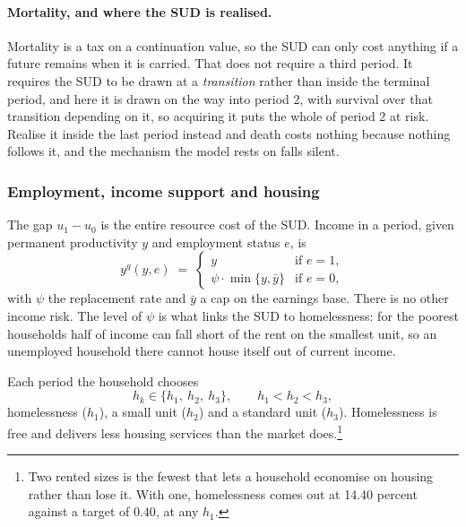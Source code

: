 \documentclass[10pt]{article}
\begin{document}
\paragraph{Mortality, and where the SUD is realised.} Mortality is a tax on
a continuation value, so the SUD can only cost anything if a future remains
when it is carried. That does not require a third period. It requires the
SUD to be drawn at a \emph{transition} rather than inside the terminal
period, and here it is drawn on the way into period 2, with survival over that
transition depending on it, so acquiring it puts the whole of period 2 at risk.
Realise it inside the last period instead and death costs nothing because
nothing follows it, and the mechanism the model rests on falls silent.


\subsubsection{Employment, income support and housing}\label{sec:support}

The gap $u_1-u_0$ is the entire resource cost of the SUD. Income in a
period, given permanent productivity $y$ and employment status $e$, is
\begin{equation}\label{eq:inc}
y^{g}(y,e) \;=\;
\begin{cases}
y & \text{if } e = 1,\\[0.2em]
\psi\cdot\min\{y,\bar y\} & \text{if } e = 0,
\end{cases}
\end{equation}
with $\psi$ the replacement rate and $\bar y$ a cap on the earnings base. There
is no other income risk. The level of $\psi$ is what links the SUD to
homelessness: for the poorest households half of income can fall short of the
rent on the smallest unit, so an unemployed household there cannot house itself
out of current income.

Each period the household chooses
\begin{equation}\label{eq:opts}
h_k \in \{h_1,\ h_2,\ h_3\}, \qquad h_1 < h_2 < h_3 ,
\end{equation}
homelessness ($h_1$), a small unit ($h_2$) and a standard unit
($h_3$). Homelessness is free and delivers less housing services than
the market does.\footnote{Two rented sizes is the fewest that lets a
household economise on housing rather than lose it. With one, homelessness comes
out at 14.40 percent against a target of $0.40$, at any $h_1$.}
\end{document}
